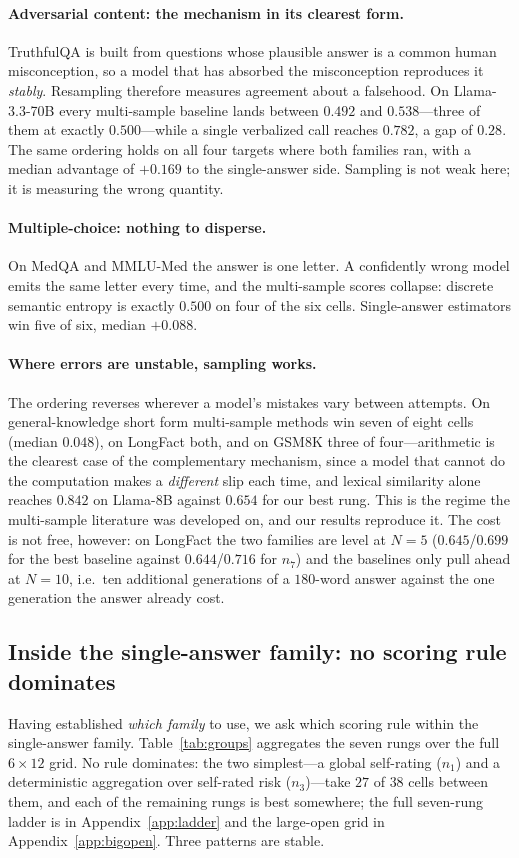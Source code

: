 \documentclass[11pt]{article}
\begin{document}
\paragraph{Adversarial content: the mechanism in its clearest form.} TruthfulQA is built from
questions whose plausible answer is a common human misconception, so a model that has absorbed
the misconception reproduces it \emph{stably}. Resampling therefore measures agreement about a
falsehood. On Llama-3.3-70B every multi-sample baseline lands between $0.492$ and $0.538$---three
of them at exactly $0.500$---while a single verbalized call reaches $0.782$, a gap of $0.28$. The
same ordering holds on all four targets where both families ran, with a median advantage of
$+0.169$ to the single-answer side. Sampling is not weak here; it is measuring the wrong quantity.

\paragraph{Multiple-choice: nothing to disperse.} On MedQA and MMLU-Med the answer is one letter.
A confidently wrong model emits the same letter every time, and the multi-sample scores collapse:
discrete semantic entropy is exactly $0.500$ on four of the six cells. Single-answer estimators
win five of six, median $+0.088$.

\paragraph{Where errors are unstable, sampling works.} The ordering reverses wherever a model's
mistakes vary between attempts. On general-knowledge short form multi-sample methods win seven of
eight cells (median $0.048$), on LongFact both, and on GSM8K three of four---arithmetic is the
clearest case of the complementary mechanism, since a model that cannot do the computation makes
a \emph{different} slip each time, and lexical similarity alone reaches $0.842$ on Llama-8B
against $0.654$ for our best rung. This is the regime the multi-sample literature was developed on, and our results reproduce
it. The cost is not free, however: on LongFact the two families are level at $N{=}5$
($0.645$/$0.699$ for the best baseline against $0.644$/$0.716$ for $n_7$) and the baselines only
pull ahead at $N{=}10$, i.e.\ ten additional generations of a $180$-word answer against the one
generation the answer already cost.

\subsection{Inside the single-answer family: no scoring rule dominates}\label{sec:minority}
Having established \emph{which family} to use, we ask which scoring rule within the
single-answer family. Table~\ref{tab:groups} aggregates the seven rungs over the full
$6\times12$ grid. No rule dominates: the two simplest---a global self-rating ($n_1$) and a
deterministic aggregation over self-rated risk ($n_3$)---take $27$ of $38$ cells between them,
and each of the remaining rungs is best somewhere; the full seven-rung ladder is in
Appendix~\ref{app:ladder} and the large-open grid in Appendix~\ref{app:bigopen}. Three patterns
are stable.
\end{document}
